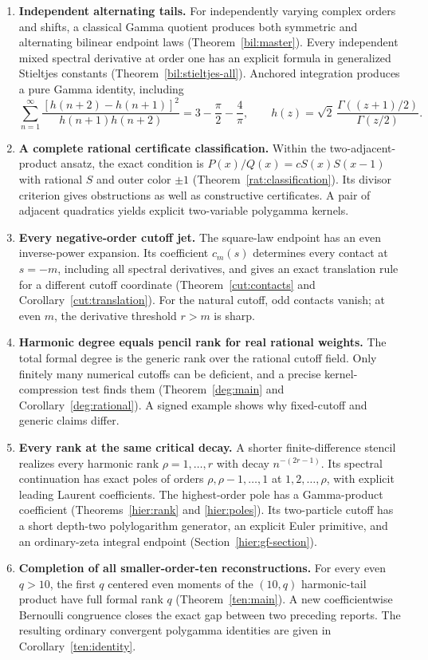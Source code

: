 \begin{enumerate}[leftmargin=*]
\item \textbf{Independent alternating tails.}
For independently varying complex orders and shifts, a classical Gamma
quotient produces both symmetric and alternating bilinear endpoint
laws (Theorem~\ref{bil:master}). Every independent mixed spectral
derivative at order one has an explicit formula in generalized
Stieltjes constants (Theorem~\ref{bil:stieltjes-all}). Anchored
integration produces a pure Gamma identity, including
\[
 \sum_{n=1}^{\infty}
 \frac{[h(n+2)-h(n+1)]^2}{h(n+1)h(n+2)}
       =3-\frac\pi2-\frac4\pi,
 \qquad h(z)=\sqrt2\,\frac{\Gamma((z+1)/2)}{\Gamma(z/2)}.
\]
\item \textbf{A complete rational certificate classification.}
Within the two-adjacent-product ansatz, the exact condition is
$P(x)/Q(x)=cS(x)S(x-1)$ with rational $S$ and outer color $\pm1$
(Theorem~\ref{rat:classification}). Its divisor criterion gives
obstructions as well as constructive certificates. A pair of adjacent
quadratics yields explicit two-variable polygamma kernels.
\item \textbf{Every negative-order cutoff jet.}
The square-law endpoint has an even inverse-power expansion. Its
coefficient $c_m(s)$ determines every contact at $s=-m$, including
all spectral derivatives, and gives an exact translation rule for a
different cutoff coordinate (Theorem~\ref{cut:contacts} and
Corollary~\ref{cut:translation}). For the natural cutoff, odd contacts
vanish; at even $m$, the derivative threshold $r>m$ is sharp.
\item \textbf{Harmonic degree equals pencil rank for real rational weights.}
The total formal degree is the generic rank over the rational cutoff
field. Only finitely many numerical cutoffs can be deficient, and a
precise kernel-compression test finds them
(Theorem~\ref{deg:main} and Corollary~\ref{deg:rational}). A signed
example shows why fixed-cutoff and generic claims differ.
\item \textbf{Every rank at the same critical decay.}
A shorter finite-difference stencil realizes every harmonic rank
$\rho=1,\ldots,r$ with decay $n^{-(2r-1)}$. Its spectral continuation
has exact poles of orders $\rho,\rho-1,\ldots,1$ at $1,2,\ldots,\rho$,
with explicit leading Laurent coefficients. The highest-order pole
has a Gamma-product coefficient
(Theorems~\ref{hier:rank} and \ref{hier:poles}). Its two-particle
cutoff has a short depth-two polylogarithm generator, an explicit
Euler primitive, and an ordinary-zeta integral endpoint
(Section~\ref{hier:gf-section}).
\item \textbf{Completion of all smaller-order-ten reconstructions.}
For every even $q>10$, the first $q$ centered even moments of the
$(10,q)$ harmonic-tail product have full formal rank $q$
(Theorem~\ref{ten:main}). A new coefficientwise Bernoulli congruence
closes the exact gap between two preceding reports. The resulting
ordinary convergent polygamma identities are given in
Corollary~\ref{ten:identity}.
\end{enumerate}

